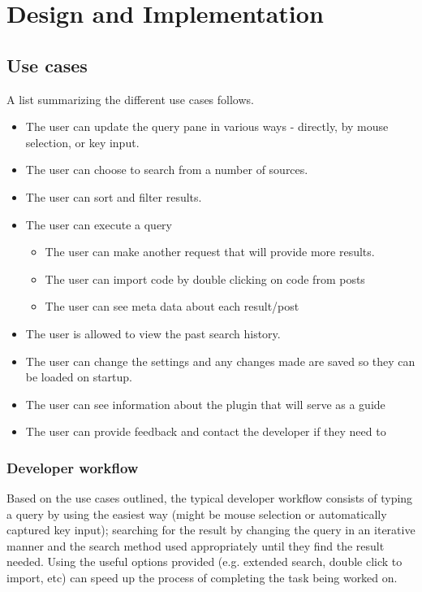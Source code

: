 \documentclass{l4proj}
\begin{document}
\chapter{Design and Implementation}

\section{Use cases}
A list summarizing the different use cases follows.

\begin{itemize}
\item The user can update the query pane in various ways - directly, by mouse selection, or key input.
\item The user can choose to search from a number of sources.
\item The user can sort and filter results.

\item The user can execute a query
\begin{itemize}
\item The user can make another request that will provide more results.
\item The user can import code by double clicking on code from posts
\item The user can see meta data about each result/post
\end{itemize}

\item The user is allowed to view the past search history. 
\item The user can change the settings and any changes made are saved so they can be loaded on startup.
\item The user can see information about the plugin that will serve as a guide
\item The user can provide feedback and contact the developer if they need to
\end{itemize}



\subsection{Developer workflow}
Based on the use cases outlined, the typical developer workflow consists of typing a query by using the easiest way (might be mouse selection or automatically captured key input); searching for the result by changing the query in an iterative manner and the search method used appropriately until they find the result needed. Using the useful options provided (e.g. extended search, double click to import, etc) can speed up the process of completing the task being worked on.
\end{document}
